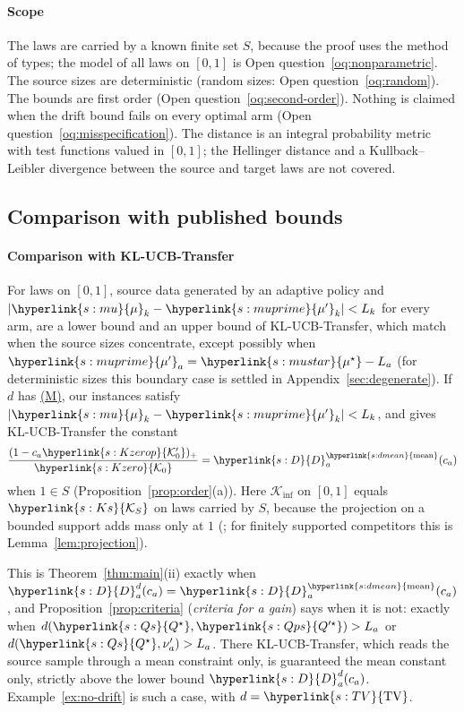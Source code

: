 \documentclass[11pt]{article}
\newcommand{\Kinf}{\mathcal{K}_{\inf}}
\newcommand{\sy}[2]{{\hyperlink{#1}{#2}}}
\newcommand{\term}[2]{\hyperlink{#1}{#2}}
\newcommand{\TV}{\sy{s:TV}{\mathrm{TV}}}
\newcommand{\Ks}{\sy{s:Ks}{\mathcal{K}_{S}}}
\newcommand{\dmean}{\sy{s:dmean}{\mathrm{mean}}}
\newcommand{\propM}{\term{s:M}{(M)}}
\newcommand{\mk}{\sy{s:mu}{\mu}}
\newcommand{\mus}{\sy{s:mustar}{\mu^{\star}}}
\newcommand{\mkp}{\sy{s:muprime}{\mu'}}
\newcommand{\Dc}{\sy{s:D}{D}}
\newcommand{\Ko}{\sy{s:Kzero}{\mathcal{K}_{0}}}
\newcommand{\Kop}{\sy{s:Kzerop}{\mathcal{K}'_{0}}}
\newcommand{\Qs}{\sy{s:Qs}{Q^{\star}}}
\newcommand{\Qps}{\sy{s:Qps}{Q'^{\star}}}
\begin{document}
\paragraph{Scope} The laws are carried by a known finite set $S$, because the proof uses the method
of types; the model of all laws on $[0,1]$ is Open question~\ref{oq:nonparametric}. The source sizes
are deterministic (random sizes: Open question~\ref{oq:random}). The bounds are first order (Open
question~\ref{oq:second-order}). Nothing is claimed when the drift bound fails on every optimal arm
(Open question~\ref{oq:misspecification}). The distance is an integral probability metric with test
functions valued in $[0,1]$; the Hellinger distance and a Kullback--Leibler divergence between the
source and target laws are not covered.

\subsection{Comparison with published bounds}\label{sec:mean-drift}

\paragraph{Comparison with KL-UCB-Transfer} For laws on $[0,1]$, source data generated by an
adaptive policy and $|\mk_k-\mkp_k|<L_k$ for every arm, \citet[Theorems~2 and~3]{PMRM26} are a lower
bound and an upper bound of KL-UCB-Transfer, which match when the source sizes concentrate,
except possibly when $\mkp_a=\mus-L_a$ \citep[Proposition~4]{PMRM26} (for deterministic sizes
this boundary case is settled in Appendix~\ref{sec:degenerate}). If $d$ has \propM{}, our instances satisfy $|\mk_k-\mkp_k|<L_k$, and
\citet[Theorem~3]{PMRM26} gives KL-UCB-Transfer the constant
\begin{equation*}
\frac{(1-c_a\Kop)_+}{\Ko}=\Dc^{\dmean}_a(c_a)
\end{equation*}
when $1\in S$ (Proposition~\ref{prop:order}(a)). Here $\Kinf$ on $[0,1]$ equals $\Ks$ on laws
carried by $S$, because the projection on a bounded support adds mass only at $1$
(\citealp[Theorem~8 and its proof]{HT10}; for finitely supported competitors this is
Lemma~\ref{lem:projection}).

This is Theorem~\ref{thm:main}(ii) exactly when $\Dc^d_a(c_a)=\Dc^{\dmean}_a(c_a)$, and
Proposition~\ref{prop:criteria} (\emph{criteria for a gain}) says when it is not: exactly when
$d(\Qs,\Qps)>L_a$ or $d(\Qs,\nu'_a)>L_a$. There KL-UCB-Transfer, which reads the source sample
through a mean constraint only, is guaranteed the mean constant only, strictly above the lower bound
$\Dc^d_a(c_a)$. Example~\ref{ex:no-drift} is such a case, with $d=\TV$.
\end{document}
